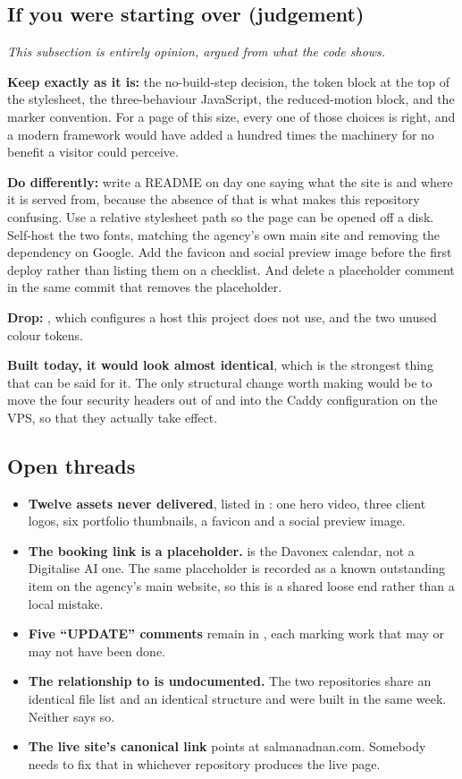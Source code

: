 \documentclass[11pt,a4paper]{article}
\begin{document}
\subsection{If you were starting over (judgement)}

\emph{This subsection is entirely opinion, argued from what the code shows.}

\textbf{Keep exactly as it is:} the no-build-step decision, the token block at the
top of the stylesheet, the three-behaviour JavaScript, the reduced-motion block,
and the \code{[deploy]} marker convention. For a page of this size, every one of
those choices is right, and a modern framework would have added a hundred times
the machinery for no benefit a visitor could perceive.

\textbf{Do differently:} write a README on day one saying what the site is and
where it is served from, because the absence of that is what makes this repository
confusing. Use a relative stylesheet path so the page can be opened off a disk.
Self-host the two fonts, matching the agency's own main site and removing the
dependency on Google. Add the favicon and social preview image before the first
deploy rather than listing them on a checklist. And delete a placeholder comment
in the same commit that removes the placeholder.

\textbf{Drop:} , which configures a host this project does not
use, and the two unused colour tokens.

\textbf{Built today, it would look almost identical}, which is the strongest thing
that can be said for it. The only structural change worth making would be to move
the four security headers out of  and into the Caddy
configuration on the VPS, so that they actually take effect.

\subsection{Open threads}

\begin{itemize}
\item \textbf{Twelve assets never delivered}, listed in : one
  hero video, three client logos, six portfolio thumbnails, a favicon and a social
  preview image.
\item \textbf{The booking link is a placeholder.}  is
  the Davonex calendar, not a Digitalise AI one. The same placeholder is recorded
  as a known outstanding item on the agency's main website, so this is a shared
  loose end rather than a local mistake.
\item \textbf{Five ``UPDATE'' comments} remain in , each marking
  work that may or may not have been done.
\item \textbf{The relationship to  is undocumented.} The two
  repositories share an identical file list and an identical structure and were
  built in the same week. Neither says so.
\item \textbf{The live site's canonical link} points at salmanadnan.com. Somebody
  needs to fix that in whichever repository produces the live page.
\end{itemize}
\end{document}
